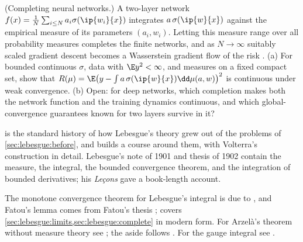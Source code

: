 \begin{refsection}
\begin{exercises}
\item\label{ex:lebesgue:meanfield} \research\harder (Completing neural networks.) A two-layer network $f(x)=\frac1N\sum_{i\le N}a_i\sigma(\ip{w_i}{x})$ integrates $a\,\sigma(\ip{w}{x})$ against the empirical measure of its parameters $(a_i,w_i)$. Letting this measure range over all probability measures completes the finite networks, and as $N\to\infty$ suitably scaled gradient descent becomes a Wasserstein gradient flow of the risk \parencite{MeiMontanariNguyen2018,ChizatBach2018}. (a) For bounded continuous $\sigma$, data with $\E y^2<\infty$, and measures on a fixed compact set, show that $R(\mu)=\E\bigl(y-\int a\,\sigma(\ip{w}{x})\dd\mu(a,w)\bigr)^2$ is continuous under weak convergence. (b) Open: for deep networks, which completion makes both the network function and the training dynamics continuous, and which global-convergence guarantees known for two layers survive in it?
\end{exercises}

\notesandrefs

\textcite{Hawkins1970} is the standard history of how Lebesgue's theory grew out of the problems of \cref{sec:lebesgue:before}, and \textcite{Bressoud2008} builds a course around them, with Volterra's construction in detail. Lebesgue's note of 1901 and thesis of 1902 contain the measure, the integral, the bounded convergence theorem, and the integration of bounded derivatives; his \emph{Leçons} \parencite{Lebesgue1904} gave a book-length account.

The monotone convergence theorem for Lebesgue's integral is due to \textcite{Levi1906}, and Fatou's lemma comes from Fatou's thesis \parencite{Fatou1906}; \textcite{Folland1999} covers \cref{sec:lebesgue:limits,sec:lebesgue:complete} in modern form. For Arzelà's theorem without measure theory see \textcite{Luxemburg1971}; the aside follows \textcite{Lewin1986}. For the gauge integral see \textcite{Bartle2001}.

\printchapterbib
\end{refsection}
